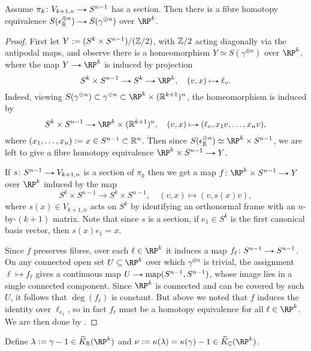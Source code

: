 \begin{lemma}
  \label{RP-reduction}
  Assume $\pi_k \c V_{k+1,n} \to S^{n-1}$ has a section. Then there
  is a fibre homotopy equivalence $S(\epsilon_\R^{\oplus n}) \to
  S(\gamma^{\oplus n})$ over $\RP^k$.
\end{lemma}

\begin{proof}
  First let $Y \mathrel{:=} (S^k \times S^{n-1})/(\mathbb{Z}/2)$, with $\mathbb{Z}/2$ acting
  diagonally via the antipodal maps, and observe there is a
  homeomorphism $Y \simeq S(\gamma^{\oplus n})$ over $\RP^k$, where the
  map $Y \to \RP^k$ is induced by projection
  \[
  S^k \times S^{n-1} \to S^k \to \RP^k, \quad (v,x) \mapsto \ell_v.
  \]
  Indeed, viewing $S(\gamma^{\oplus n}) \subset \gamma^{\oplus n}
  \subset \RP^k \times (\R^{k+1})^n$, the homeomorphism is induced by
  \[
  S^k \times S^{n-1} \to \RP^k \times (\R^{k+1})^n, \quad (v,x)
  \mapsto (\ell_v, x_1v, \ldots, x_nv),
  \]
  where $(x_1,\ldots,x_n) \mathrel{:=} x \in S^{n-1} \subset \mathbb{R}^n$. Then since
  $S(\epsilon_\R^{\oplus n}) \simeq \RP^k \times S^{n-1}$, we are
  left to give a fibre homotopy equivalence $\RP^k \times S^{n-1} \to
  Y$.

  If $s \c S^{n-1} \to V_{k+1,n}$ is a section of $\pi_k$ then we
  get a map $f \c \RP^k \times S^{n-1} \to Y$ over $\RP^k$ induced by
  the map
  \[
  S^k \times S^{n-1} \to S^k \times S^{n-1}, \quad (v,x) \mapsto
  (v, s(x)v),
  \]
  where $s(x) \in V_{k+1,n}$ acts on $S^k$ by identifying an
  orthonormal frame with an $n$-by-$(k+1)$ matrix. Note that since $s$
  is a section, if $e_1 \in S^k$ is the first canonical basis vector,
  then $s(x)e_1 = x$.

  Since $f$ preserves fibres, over each $\ell \in \RP^k$ it induces a
  map $f_\ell \c S^{n-1} \to S^{n-1}$. On any connected open set $U
  \subseteq \RP^k$ over which $\gamma^{\oplus n}$ is trivial, the
  assignment $\ell \mapsto f_\ell$ gives a continuous map $U \to
  \map(S^{n-1},S^{n-1})$, whose image lies in a single connected
  component. Since $\RP^k$ is connected and can be covered by such
  $U$, it follows that $\deg(f_\ell)$ is constant. But above we noted
  that $f$ induces the identity over $\ell_{e_1}$, so in fact $f_\ell$
  must be a homotopy equivalence for all $\ell \in \RP^k$. We are then
  done by .
\end{proof}

\begin{notation}
  \label{RP-notation}
  Define $\lambda \ce \gamma - 1 \in \til K_\R(\RP^k)$ and $\nu \ce
  \kappa(\lambda) = \kappa(\gamma) - 1 \in \til K_\C(\RP^k)$.
\end{notation}

